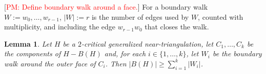 \documentclass[12pt]{article}
\newtheorem{lem}{Lemma}
\theoremstyle{definition}
\newcommand{\pat}[1]{[\textcolor{red}{PM: #1}]}
\begin{document}

\pat{Define boundary walk around a face.}  For a boundary walk $W:=w_0,\ldots,w_{r-1}$, $|W|:=r$ is the number of edges used by $W$, counted with multiplicity, and including the edge $w_{r-1}w_0$ that closes the walk.

\begin{lem}\label{boundary_vs_walk}
  Let $H$ be a $2$-critical generalized near-triangulation, let $C_1,\ldots,C_k$ be the components of $H-B(H)$ and, for each $i\in\{1,\ldots,k\}$, let $W_i$ be the boundary walk around the outer face of $C_i$. Then $|B(H)|\ge \sum_{i=1}^k |W_i|$.
\end{lem}
\end{document}
